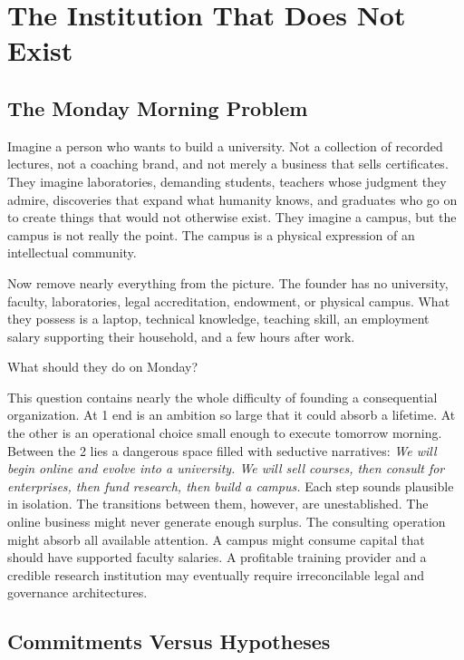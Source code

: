\section{The Institution That Does Not Exist}

\subsection{The Monday Morning Problem}

Imagine a person who wants to build a university. Not a collection of recorded lectures, not a coaching brand, and not merely a business that sells certificates. They imagine laboratories, demanding students, teachers whose judgment they admire, discoveries that expand what humanity knows, and graduates who go on to create things that would not otherwise exist. They imagine a campus, but the campus is not really the point. The campus is a physical expression of an intellectual community.

Now remove nearly everything from the picture. The founder has no university, faculty, laboratories, legal accreditation, endowment, or physical campus. What they possess is a laptop, technical knowledge, teaching skill, an employment salary supporting their household, and a few hours after work.

What should they do on Monday?

This question contains nearly the whole difficulty of founding a consequential organization. At 1 end is an ambition so large that it could absorb a lifetime. At the other is an operational choice small enough to execute tomorrow morning. Between the 2 lies a dangerous space filled with seductive narratives: \textit{We will begin online and evolve into a university. We will sell courses, then consult for enterprises, then fund research, then build a campus.} Each step sounds plausible in isolation. The transitions between them, however, are unestablished. The online business might never generate enough surplus. The consulting operation might absorb all available attention. A campus might consume capital that should have supported faculty salaries. A profitable training provider and a credible research institution may eventually require irreconcilable legal and governance architectures.

\subsection{Commitments Versus Hypotheses}

